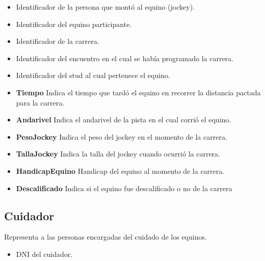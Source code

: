 \documentclass[a4paper,11pt]{article}
\begin{document}
\begin{itemize}

  \item \textbf{\uline{}} Identificador de la persona que montó
	al equino (jockey).
  
  \item \textbf{\uline{}} Identificador del equino participante.
  
  \item \textbf{\uline{}} Identificador de la carrera.
  
  \item \textbf{\uline{}} Identificador del encuentro
        en el cual se había programado la carrera.
  
  \item \textbf{} Identificador del stud al cual pertenece el equino.
  
  \item \textbf{Tiempo} Indica el tiempo que tardó el equino en recorrer la distancia
	pactada para la carrera.
  
  \item \textbf{Andarivel} Indica el andarivel de la pista en el cual
	corrió el equino.
  
  \item \textbf{PesoJockey} Indica el peso del jockey en el momento de la carrera.
  
  \item \textbf{TallaJockey} Indica la talla del jockey cuando ocurrió la carrera.
  
  \item \textbf{HandicapEquino} Handicap del equino al momento de la carrera.
  
  \item \textbf{Descalificado} Indica si el equino fue descalificado o no
	de la carrera
  
\end{itemize}


\subsection{Cuidador}

Representa a las personas encargadas del cuidado de los equinos.

\begin{itemize}

        \item \textbf{\uline{}} DNI del cuidador.
	
\end{itemize}
\end{document}
